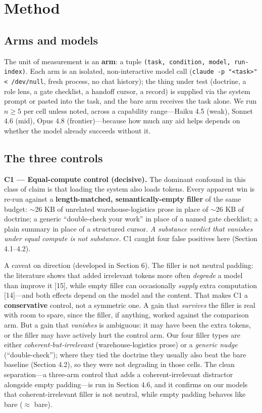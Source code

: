 \documentclass[11pt]{article}
\begin{document}
\section{Method}

\subsection{Arms and models}

The unit of measurement is an \textbf{arm}: a tuple \texttt{(task, condition, model, run-index)}.
Each arm is an isolated, non-interactive model call (\texttt{claude -p "<task>" < /dev/null},
fresh process, no chat history); the thing under test (doctrine, a role lens, a gate
checklist, a handoff cursor, a record) is supplied via the system prompt or pasted into
the task, and the bare arm receives the task alone. We run $n \geq 5$ per cell unless noted,
across a capability range---Haiku 4.5 (weak), Sonnet 4.6 (mid), Opus 4.8 (frontier)---because
how much any aid helps depends on whether the model already succeeds without it.

\subsection{The three controls}

\textbf{C1 --- Equal-compute control (decisive).} The dominant confound in this class of claim
is that loading the system also loads tokens. Every apparent win is re-run against a
\textbf{length-matched, semantically-empty filler} of the same budget: $\sim$26 KB of unrelated
warehouse-logistics prose in place of $\sim$26 KB of doctrine; a generic ``double-check your
work'' in place of a named gate checklist; a plain summary in place of a structured
cursor. \emph{A substance verdict that vanishes under equal compute is not substance.} C1
caught four false positives here (Section 4.1--4.2).

A caveat on direction (developed in Section 6). The filler is not neutral padding: the
literature shows that added irrelevant tokens more often \emph{degrade} a model than improve
it [15], while empty filler can occasionally \emph{supply} extra computation [14]---and both
effects depend on the model and the content. That makes C1 a \textbf{conservative} control,
not a symmetric one. A gain that \emph{survives} the filler is real with room to spare, since
the filler, if anything, worked against the comparison arm. But a gain that \emph{vanishes}
is ambiguous: it may have been the extra tokens, or the filler may have actively hurt the
control arm. Our four filler types are either \emph{coherent-but-irrelevant}
(warehouse-logistics prose) or a \emph{generic nudge} (``double-check''); where they tied the
doctrine they usually also beat the bare baseline (Section 4.2), so they were not degrading
in those cells. The clean separation---a three-arm control that adds a coherent-irrelevant
distractor alongside empty padding---is run in Section 4.6, and it confirms on our models
that coherent-irrelevant filler is not neutral, while empty padding behaves like bare
($\approx$ bare).
\end{document}
